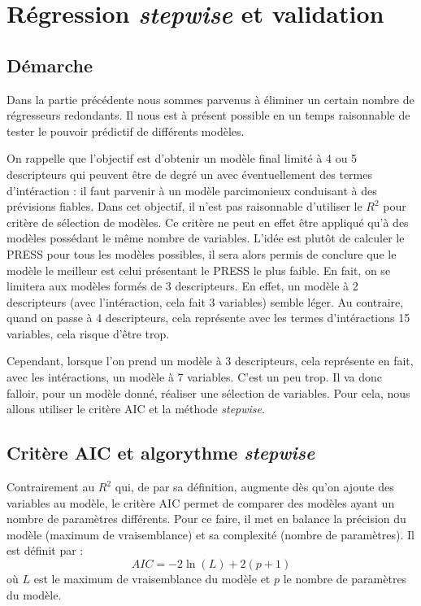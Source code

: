 
\chapter {Régression \emph{stepwise} et validation}

\section{Démarche}

Dans la partie précédente nous sommes parvenus à éliminer un certain nombre de régresseurs redondants. Il nous est à présent possible en un temps raisonnable de tester le pouvoir prédictif de différents modèles. 

On rappelle que l'objectif est d'obtenir un modèle final limité à 4 ou 5 descripteurs qui peuvent être de degré un avec éventuellement des termes d'intéraction : il faut parvenir à un modèle parcimonieux conduisant à des prévisions fiables. 
Dans cet objectif, il n'est pas raisonnable d'utiliser le $R^2$ pour critère de sélection de modèles. Ce critère ne peut en effet être appliqué qu'à des modèles possédant le même nombre de variables.
L'idée est plutôt de calculer le PRESS pour tous les modèles possibles, il sera alors permis de conclure que le modèle le meilleur est celui présentant le PRESS le plus faible. En fait, on se limitera aux modèles formés de 3 descripteurs. En effet, un modèle à 2 descripteurs (avec l'intéraction, cela fait 3 variables) semble léger. Au contraire, quand on passe à 4 descripteurs, cela représente avec les termes d'intéractions 15 variables, cela risque d'être trop.

Cependant, lorsque l'on prend un modèle à 3 descripteurs, cela représente en fait, avec les intéractions, un modèle à 7 variables. C'est un peu trop. Il va donc falloir, pour un modèle donné, réaliser une sélection de variables. Pour cela, nous allons utiliser le critère AIC et la méthode \emph{stepwise}.

\section{Critère AIC et algorythme \emph{stepwise}}

Contrairement au $R^2$ qui, de par sa définition, augmente dès qu'on ajoute des variables au modèle, le critère AIC permet de comparer des modèles ayant un nombre de paramètres différents. Pour ce faire, il met en balance la précision du modèle (maximum de vraisemblance) et sa complexité (nombre de paramètres). Il est définit par :
\[AIC = -2 \ln{(L)} + 2(p +1)\]
où $L$ est le maximum de vraisemblance du modèle et $p$ le nombre de paramètres du modèle.

